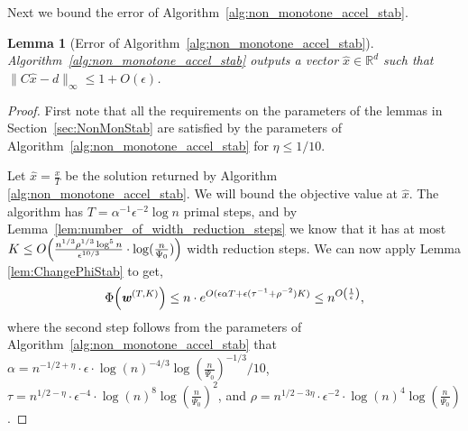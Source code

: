 \documentclass[11pt]{article}
\newtheorem{lemma}[theorem]{Lemma}
\let\originalleft\left
\let\originalright\right
\renewcommand{\left}{\mathopen{}\mathclose\bgroup\originalleft}
\renewcommand{\right}{\aftergroup\egroup\originalright}
\newcommand\dd{\boldsymbol{\mathit{d}}}
\newcommand\ww{\boldsymbol{\mathit{w}}}
\newcommand\xx{\boldsymbol{\mathit{x}}}
\newcommand\CC{\boldsymbol{\mathit{C}}}
\newcommand\xxhat{\widehat{\xx}}
\newcommand\R{\mathbb{R}}
\begin{document}
Next we bound the error of Algorithm~\ref{alg:non_monotone_accel_stab}.
\begin{lemma}[Error of Algorithm~\ref{alg:non_monotone_accel_stab}]\label{lem:error_non_monotone_acc_stab}
Algorithm~\ref{alg:non_monotone_accel_stab} outputs a vector $\xxhat \in \R^d$ such that $\|\CC \xxhat - \dd\|_{\infty} \leq 1 + O(\epsilon)$.
\end{lemma}
\begin{proof}
First note that all the requirements on the parameters of the lemmas in Section~\ref{sec:NonMonStab} are satisfied by the parameters of Algorithm~\ref{alg:non_monotone_accel_stab} for $\eta \leq 1/10$.

Let $\xxhat = \frac{\xx}{T}$ be the solution returned by Algorithm \ref{alg:non_monotone_accel_stab}. We will bound the objective value at $\xxhat$. The algorithm has $T = \alpha^{-1}\epsilon^{-2}\log n$ primal steps, and by Lemma~\ref{lem:number_of_width_reduction_steps} we know that it has at most $K \leq O\left(\frac{n^{1/3} \rho^{1/3} \log^5 n}{\epsilon^{10/3}} \cdot \log(\frac{n}{\Psi_0}) \right)$ width reduction steps. We can now apply Lemma \ref{lem:ChangePhiStab} to get,
\[
\Phi\left(\ww^{(T,K)}\right) \le  n\cdot  e^{O(\epsilon\alpha T+\epsilon(\tau^{-1}+\rho^{-2}) K)} \leq  n^{O\left(\frac{1}{\epsilon} \right)},
\]
where the second step follows from the parameters of Algorithm~\ref{alg:non_monotone_accel_stab} that $\alpha = n^{-1/2+\eta} \cdot \epsilon \cdot \log(n)^{-4/3} \log(\frac{n}{\Psi_0})^{-1/3} / 10$, $\tau = n^{1/2-\eta} \cdot \epsilon^{-4} \cdot \log(n)^8 \log(\frac{n}{\Psi_0})^2$, and $\rho = n^{1/2-3\eta} \cdot \epsilon^{-2} \cdot \log(n)^4 \log(\frac{n}{\Psi_0})$.


\end{proof}
\end{document}

